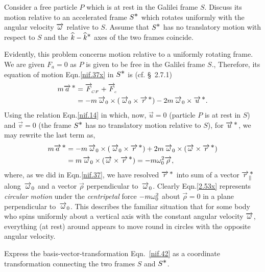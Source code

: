 \exm Consider a free particle $P$ which is at rest in the
Galilei frame $S$. Discuss its motion relative to an 
accelerated frame $S^{\textstyle \ast}$ which rotates uniformly with the 
angular velocity $\overrightarrow{{\omega}}$ relative to $S$. Assume that 
$S^{\textstyle \ast}$ has no translatory motion with respect to $S$ and 
the ${\widehat{k}}-{\widehat{k}}^{\textstyle \ast}$ axes of the two frames coincide.

\soln Evidently, this problem concerns motion relative to a 
uniformly rotating frame. We are given $F_a=0$ as $P$ is 
given to be free in the Galilei frame $S$., Therefore, its 
equation of motion Eqn.\eqref{nif.37x} in $S^{\textstyle \ast}$ is (cf. 
\S~2.7.1)
\begin{align}
m{\overrightarrow{a}^{\,{\textstyle \ast}}}&=\overrightarrow{F}_{_{\hspace*{-1.5pt}{CF}}} +\overrightarrow{F}_{{_{\hspace*{-1.5pt}{c}}}}\notag\\
&=-m \,\overrightarrow{{\omega}}_0\times ( \,\overrightarrow{{\omega}}_0 \times
\overrightarrow{r}^{\,{\textstyle \ast}})-2m\,\overrightarrow{{\omega}}_0\times{\overrightarrow{u}^{\,{\ensuremath{\textstyle \ast}}}} .
\end{align}
Using the relation Eqn.\eqref{nif.14} in which, now, 
$\vec{u}=0$ 
(particle $P$ is at rest in $S$) and $\vec{v}=0$ (the frame 
$S^{\textstyle \ast}$ has no translatory motion relative to $S$), for 
${\overrightarrow{u}^{\,{\textstyle \ast}}}$, we may rewrite the last term as,
\begin{align}\label{2.53x}
m{\overrightarrow{a}^{\,{\textstyle \ast}}}&=-m \,\overrightarrow{{\omega}}_0\times ( \,\overrightarrow{{\omega}}_0 \times
\overrightarrow{r}^{\,{\textstyle \ast}})
+2m\,\overrightarrow{{\omega}}_0\times(\overrightarrow{{\omega}}\times{\overrightarrow{r}^{\,{\ensuremath{\textstyle \ast}}}})\notag\\
&=m\,\overrightarrow{{\omega}}_0\times(\overrightarrow{{\omega}}\times{\overrightarrow{r}^{\,{\ensuremath{\textstyle \ast}}}})
=-m{\omega}_0^2 \overrightarrow{\rho},
\end{align}
where, as we did in Eqn.\eqref{nif.37}, we have resolved 
$\overrightarrow{r}^{\,{\textstyle \ast}}$ into sum of a vector 
$\overrightarrow{r}_{\parallel}^{\,{\textstyle \ast} }$ along $\,\overrightarrow{{\omega}}_0$ and 
a 
vector $\vec{\rho}$ perpendicular to $\,\overrightarrow{{\omega}}_0 $. 
Clearly Eqn.\eqref{2.53x} represents \textsl{circular 
motion} under the \textsl{centripetal} force $-m{\omega}_0^2$ 
about $\vec{\rho}=0$ in a plane perpendicular to 
$\,\overrightarrow{{\omega}}_0 $. This describes the familiar situation 
that 
for some body who spins uniformly about a vertical axis 
with 
the constant angular velocity $\overrightarrow{{\omega}}$, everything (at 
rest) around appears to move round in circles with the 
opposite angular velocity.

\exm Express the basis-vector-transformation  
Eqn.~\break\eqref{nif.42} as a coordinate transformation 
connecting 
the two frames $S$ and $S^{\textstyle \ast}$. 



